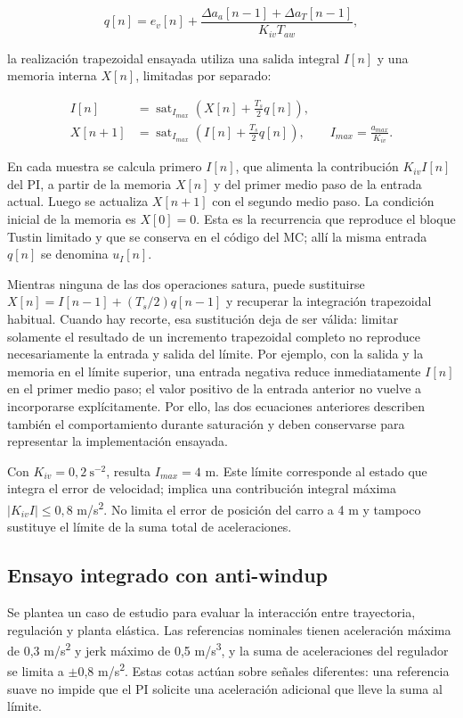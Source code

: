 \documentclass[a4paper,10pt,onecolumn,journal]{ieeeconf}
\numberwithin{equation}{section}
\begin{document}
\begin{equation}
q[n]=e_v[n]+\frac{\Delta a_a[n-1]+\Delta a_T[n-1]}{K_{iv}T_{aw}},
\end{equation}

la realización trapezoidal ensayada utiliza una salida integral $I[n]$ y una memoria interna $X[n]$, limitadas por separado:

\begin{align}
I[n]&=\operatorname{sat}_{I_{max}}\left(X[n]+\frac{T_s}{2}q[n]\right),\\
X[n+1]&=\operatorname{sat}_{I_{max}}\left(I[n]+\frac{T_s}{2}q[n]\right),
\qquad I_{max}=\frac{a_{max}}{K_{iv}}.
\end{align}

En cada muestra se calcula primero $I[n]$, que alimenta la contribución $K_{iv}I[n]$ del PI, a partir de la memoria $X[n]$ y del primer medio paso de la entrada actual. Luego se actualiza $X[n+1]$ con el segundo medio paso. La condición inicial de la memoria es $X[0]=0$. Esta es la recurrencia que reproduce el bloque Tustin limitado y que se conserva en el código del MC; allí la misma entrada $q[n]$ se denomina $u_I[n]$.

Mientras ninguna de las dos operaciones satura, puede sustituirse $X[n]=I[n-1]+(T_s/2)q[n-1]$ y recuperar la integración trapezoidal habitual. Cuando hay recorte, esa sustitución deja de ser válida: limitar solamente el resultado de un incremento trapezoidal completo no reproduce necesariamente la entrada y salida del límite. Por ejemplo, con la salida y la memoria en el límite superior, una entrada negativa reduce inmediatamente $I[n]$ en el primer medio paso; el valor positivo de la entrada anterior no vuelve a incorporarse explícitamente. Por ello, las dos ecuaciones anteriores describen también el comportamiento durante saturación y deben conservarse para representar la implementación ensayada.

Con $K_{iv}=0,2\ \mathrm{s^{-2}}$, resulta $I_{max}=4$ m. Este límite corresponde al estado que integra el error de velocidad; implica una contribución integral máxima $|K_{iv}I|\leq0,8$ m/s\textsuperscript{2}. No limita el error de posición del carro a 4 m y tampoco sustituye el límite de la suma total de aceleraciones.


\subsection{Ensayo integrado con anti-windup}
Se plantea un caso de estudio para evaluar la interacción entre trayectoria, regulación y planta elástica. Las referencias nominales tienen aceleración máxima de 0,3 m/s\textsuperscript{2} y jerk máximo de 0,5 m/s\textsuperscript{3}, y la suma de aceleraciones del regulador se limita a \(\pm\)0,8 m/s\textsuperscript{2}. Estas cotas actúan sobre señales diferentes: una referencia suave no impide que el PI solicite una aceleración adicional que lleve la suma al límite.
\end{document}
